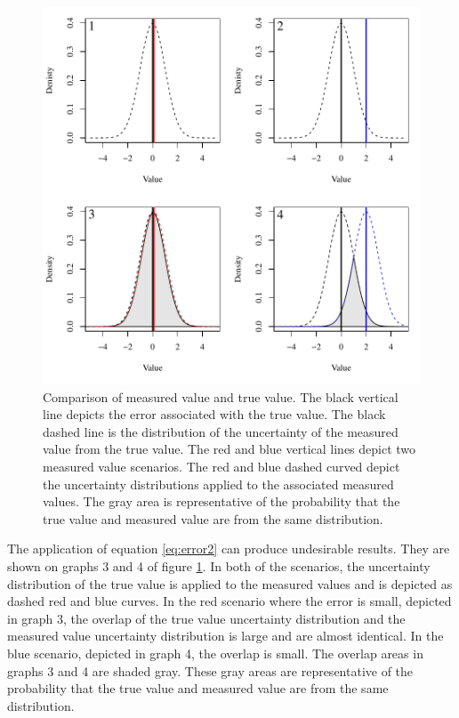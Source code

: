 \begin{figure}[htbp]
	\begin{center}
		\includegraphics[width=6in]{"Figures/TV-MV Error"}
		\caption[Comparison of measured value and true value]{Comparison of measured value and true value.  The black vertical line depicts the error associated with the true value.  The black dashed line is the distribution of the uncertainty of the measured value from the true value.  The red and blue vertical lines depict two measured value scenarios.  The red and blue dashed curved depict the uncertainty distributions applied to the associated measured values.  The gray area is representative of the probability that the true value and measured value are from the same distribution.}
		\label{fig:TV-MVError}
	\end{center}
\end{figure}

The application of equation \ref{eq:error2} can produce undesirable results.  They are shown on graphs 3 and 4 of figure \ref{fig:TV-MVError}.  In both of the scenarios, the uncertainty distribution of the true value is applied to the measured values and is depicted as dashed red and blue curves.  In the red scenario where the error is small, depicted in graph 3, the overlap of the true value uncertainty distribution and the measured value uncertainty distribution is large and are almost identical.  In the blue scenario, depicted in graph 4, the overlap is small.  The overlap areas in graphs 3 and 4 are shaded gray.  These gray areas are representative of the probability that the true value and measured value are from the same distribution.

